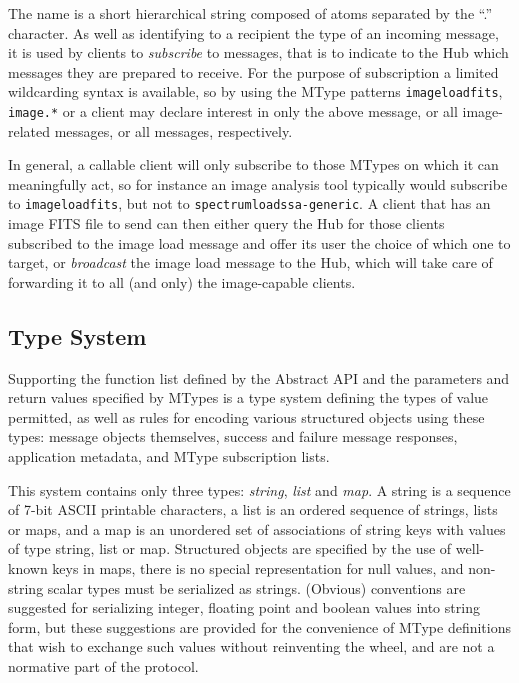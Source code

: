 \documentclass[5p]{elsarticle}
\begin{document}
The name is a short hierarchical string composed of atoms separated
by the ``.'' character.
As well as identifying to a recipient the type of an incoming message,
it is used by clients to {\em subscribe\/} to messages, that is to
indicate to the Hub which messages they are prepared to receive.
For the purpose of subscription a limited wildcarding syntax is available,
so by using the MType patterns
{\tt image{\kdot}load{\kdot}fits}, {\tt image.*} or {\tt *}
a client may declare interest in only the above message,
or all image-related messages, or all messages, respectively.

In general, a callable client will only subscribe to those MTypes on which
it can meaningfully act, so for instance an image analysis tool
typically would subscribe to {\tt image{\kdot}load{\kdot}fits},
but not to {\tt spectrum{\kdot}load{\kdot}ssa-generic}.
A client that has an image FITS file to send can then
either query the Hub for those clients subscribed to the image load
message and offer its user the choice of which one to target,
or {\em broadcast} the image load message to the Hub, which will
take care of forwarding it to all (and only) the image-capable clients.

\subsection{Type System} \label{sec:typeSystem}

Supporting the function list defined by the Abstract API
and the parameters and return values specified by MTypes
is a type system defining the types of value permitted,
as well as rules for encoding various structured objects
using these types: message objects themselves, success and failure
message responses, application metadata, and MType subscription lists.

This system contains only three types:
{\em string}, {\em list\/} and {\em map}.
A string is a sequence of 7-bit ASCII printable characters,
a list is an ordered sequence of strings, lists or maps, and
a map is an unordered set of associations of string keys with values
of type string, list or map.
Structured objects are specified by the use of well-known keys in maps,
there is no special representation for null values,
and non-string scalar types must be serialized as strings.
(Obvious) conventions are suggested for serializing
integer, floating point and boolean values into string form,
but these suggestions are provided for the convenience
of MType definitions that wish to exchange such values without
reinventing the wheel, and are not a normative part of the protocol.
\end{document}
